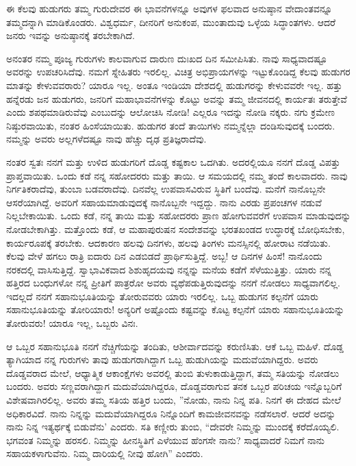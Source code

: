 ಈ ಕೆಲವು ಹುಡುಗರು ತಮ್ಮ ಗುರುದೇವರ ಈ ಭಾವನೆಗಳನ್ನೂ ಅವುಗಳ ಫಲವಾದ ಅನುಷ್ಠಾನ ವೇದಾಂತವನ್ನೂ ತಮ್ಮದನ್ನಾಗಿ ಮಾಡಿಕೊಂಡರು. ವಿಶ್ವಧರ್ಮ, ದೀನರಿಗೆ ಅನುಕಂಪ, ಮುಂತಾದುವು ಒಳ್ಳೆಯ ಸಿದ್ಧಾಂತಗಳು. ಆದರೆ ಜನರು ಇವನ್ನು ಅನುಷ್ಠಾನಕ್ಕೆ ತರಬೇಕಾಗಿದೆ.

ಅನಂತರ ನಮ್ಮ ಪೂಜ್ಯ ಗುರುಗಳು ಕಾಲವಾಗುವ ದಾರುಣ ದುಃಖದ ದಿನ ಸಮೀಪಿಸಿತು. ನಾವು ಸಾಧ್ಯವಾದಷ್ಟೂ ಅವರನ್ನು ಉಪಚರಿಸಿದೆವು. ನಮಗೆ ಸ್ನೇಹಿತರು ಇರಲಿಲ್ಲ. ವಿಚಿತ್ರ ಅಭಿಪ್ರಾಯಗಳನ್ನು ಇಟ್ಟುಕೊಂಡಿದ್ದ ಕೆಲವು ಹುಡುಗರ ಮಾತನ್ನು ಕೇಳುವವರಾರು? ಯಾರೂ ಇಲ್ಲ. ಅಂತೂ ಇಂಡಿಯಾ ದೇಶದಲ್ಲಿ ಹುಡುಗರನ್ನು ಕೇಳುವವರೇ ಇಲ್ಲ. ಹತ್ತು ಹನ್ನೆರಡು ಜನ ಹುಡುಗರು, ಜನರಿಗೆ ಮಹಾಭಾವನೆಗಳನ್ನು ಕೊಟ್ಟು ಅವನ್ನು ತಮ್ಮ ಜೀವನದಲ್ಲಿ ಕಾರ್ಯತಃ ತರುತ್ತೇವೆ ಎಂದು ಶಪಥಮಾಡಿರುವೆವು ಎಂಬುದನ್ನು ಆಲೋಚಿಸಿ ನೋಡಿ! ಎಲ್ಲರೂ ಇದನ್ನು ನೋಡಿ ನಕ್ಕರು. ನಗು ಕ್ರಮೇಣ ನಿಷ್ಠುರವಾಯಿತು, ನಂತರ ಹಿಂಸೆಯಾಯಿತು. ಹುಡುಗರ ತಂದೆ ತಾಯಿಗಳು ನಮ್ಮನ್ನೆಲ್ಲಾ ದಂಡಿಸುವುದಕ್ಕೆ ಬಂದರು. ನಮ್ಮನ್ನು ಅವರು ಅಲ್ಲಗಳೆದಷ್ಟೂ ನಾವು ಹೆಚ್ಚು ದೃಢ ಪ್ರತಿಜ್ಞರಾದೆವು.

ನಂತರ ಸ್ವತಃ ನನಗೆ ಮತ್ತು ಉಳಿದ ಹುಡುಗರಿಗೆ ದೊಡ್ಡ ಕಷ್ಟಕಾಲ ಒದಗಿತು. ಅದರಲ್ಲಿಯೂ ನನಗೆ ದೊಡ್ಡ ವಿಪತ್ತು ಪ್ರಾಪ್ತವಾಯಿತು. ಒಂದು ಕಡೆ ನನ್ನ ಸಹೋದರರು ಮತ್ತು ತಾಯಿ. ಆ ಸಮಯದಲ್ಲಿ ನಮ್ಮ ತಂದೆ ಕಾಲವಾದರು. ನಾವು ನಿರ್ಗತಿಕರಾದೆವು, ತುಂಬಾ ಬಡವರಾದೆವು. ದಿನವೆಲ್ಲ ಉಪವಾಸವಿರುವ ಸ್ಥಿತಿಗೆ ಬಂದೆವು. ಮನೆಗೆ ನಾನೊಬ್ಬನೇ ಆಸರೆಯಾಗಿದ್ದೆ. ಅವರಿಗೆ ಸಹಾಯಮಾಡುವುದಕ್ಕೆ ನಾನೊಬ್ಬನೇ ಇದ್ದದ್ದು. ನಾನು ಎರಡು ಪ್ರಪಂಚಗಳ ನಡುವೆ ನಿಲ್ಲಬೇಕಾಯಿತು. ಒಂದು ಕಡೆ, ನನ್ನ ತಾಯಿ ಮತ್ತು ಸಹೋದರರು ಪ್ರಾಣ ಹೋಗುವವರೆಗೆ ಉಪವಾಸ ಮಾಡುವುದನ್ನು ನೋಡಬೇಕಾಗಿತ್ತು. ಮತ್ತೊಂದು ಕಡೆ, ಆ ಮಹಾಪುರುಷನ ಸಂದೇಶವನ್ನು ಭರತಖಂಡದ ಉದ್ಧಾರಕ್ಕೆ ಬೋಧಿಸಬೇಕು, ಕಾರ್ಯರೂಪಕ್ಕೆ ತರಬೇಕು. ಆದಕಾರಣ ಹಲವು ದಿನಗಳು, ಹಲವು ತಿಂಗಳು ಮನಸ್ಸಿನಲ್ಲಿ ಹೋರಾಟ ನಡೆಯಿತು. ಕೆಲವು ವೇಳೆ ಹಗಲು ರಾತ್ರಿ ಐದಾರು ದಿನ ಎಡಬಿಡದೆ ಪ್ರಾರ್ಥಿಸುತ್ತಿದ್ದೆ. ಅಬ್ಬ! ಆ ದಿನಗಳ ಹಿಂಸೆ! ನಾನೊಂದು ನರಕದಲ್ಲಿ ವಾಸಿಸುತ್ತಿದ್ದೆ. ಸ್ವಾಭಾವಿಕವಾದ ಶಿಶುಹೃದಯವು ನನ್ನನ್ನು ಮನೆಯ ಕಡೆಗೆ ಸೆಳೆಯುತ್ತಿತ್ತು. ಯಾರು ನನ್ನ ಹತ್ತಿರದ ಬಂಧುಗಳೋ ನನ್ನ ಪ್ರೀತಿಗೆ ಪಾತ್ರರೋ ಅವರು ವ್ಯಥೆಪಡುತ್ತಿರುವುದನ್ನು ನನಗೆ ನೋಡಲು ಸಾಧ್ಯವಾಗಲಿಲ್ಲ. ಇದಲ್ಲದೆ ನನಗೆ ಸಹಾನುಭೂತಿಯನ್ನು ತೋರುವವರು ಯಾರು ಇರಲಿಲ್ಲ. ಒಬ್ಬ ಹುಡುಗನ ಕಲ್ಪನೆಗೆ ಯಾರು ಸಹಾನುಭೂತಿಯನ್ನು ತೋರಿಯಾರು! ಅನ್ಯರಿಗೆ ಅಷ್ಟೊಂದು ಕಷ್ಟವನ್ನು ಕೊಟ್ಟ ಕಲ್ಪನೆಗೆ ಯಾರು ಸಹಾನುಭೂತಿಯನ್ನು ತೋರುವರು! ಯಾರೂ ಇಲ್ಲ, ಒಬ್ಬರು ವಿನಃ.

ಆ ಒಬ್ಬರ ಸಹಾನುಭೂತಿ ನನಗೆ ನೆಚ್ಚಿಗೆಯನ್ನು ತಂದಿತು, ಆಶೀರ್ವಾದವನ್ನು ಕರುಣಿಸಿತು. ಆಕೆ ಒಬ್ಬ ಮಹಿಳೆ. ದೊಡ್ಡ ತ್ಯಾಗಿಯಾದ ನನ್ನ ಗುರುಗಳು ತಾವು ಹುಡುಗರಾಗಿದ್ದಾಗ ಒಬ್ಬ ಹುಡುಗಿಯನ್ನು ಮದುವೆಯಾಗಿದ್ದರು. ಅವರು ದೊಡ್ಡವರಾದ ಮೇಲೆ, ಆಧ್ಯಾತ್ಮಿಕ ಆಕಾಂಕ್ಷೆಗಳು ಅವರಲ್ಲಿ ತುಂಬಿ ತುಳುಕಾಡುತ್ತಿದ್ದಾಗ, ತಮ್ಮ ಸತಿಯನ್ನು ನೋಡಲು ಬಂದರು. ಅವರು ಸಣ್ಣವರಾಗಿದ್ದಾಗ ಮದುವೆಯಾಗಿದ್ದರೂ, ದೊಡ್ಡವರಾಗುವ ತನಕ ಒಬ್ಬರ ಪರಿಚಯ ಇನ್ನೊಬ್ಬರಿಗೆ ವಿಶೇಷವಾಗಿರಲಿಲ್ಲ. ಅವರು ತಮ್ಮ ಸತಿಯ ಹತ್ತಿರ ಬಂದು, ''ನೋಡು, ನಾನು ನಿನ್ನ ಪತಿ. ನಿನಗೆ ಈ ದೇಹದ ಮೇಲೆ ಅಧಿಕಾರವಿದೆ. ನಾನು ನಿನ್ನನ್ನು ಮದುವೆಯಾಗಿದ್ದರೂ ನಿನ್ನೊಂದಿಗೆ ಕಾಮಜೀವನವನ್ನು ನಡೆಸಲಾರೆ. ಆದರೆ ಅದನ್ನು ನಾನು ನಿನ್ನ ಇತ್ಯರ್ಥಕ್ಕೆ ಬಿಡುವೆನು' ಎಂದರು. ಸತಿ ಕಣ್ಣೀರು ತುಂಬಿ, “ದೇವರೇ ನಿಮ್ಮನ್ನು ಮುಂದಕ್ಕೆ ಕರೆದೊಯ್ಯಲಿ. ಭಗವಂತ ನಿಮ್ಮನ್ನು ಹರಸಲಿ. ನಿಮ್ಮನ್ನು ಹೀನಸ್ಥಿತಿಗೆ ಎಳೆಯುವ ಹೆಂಗಸೇ ನಾನು? ಸಾಧ್ಯವಾದರೆ ನಿಮಗೆ ನಾನು ಸಹಾಯಕಳಾಗುವೆನು. ನಿಮ್ಮ ದಾರಿಯಲ್ಲಿ ನೀವು ಹೋಗಿ” ಎಂದರು.

